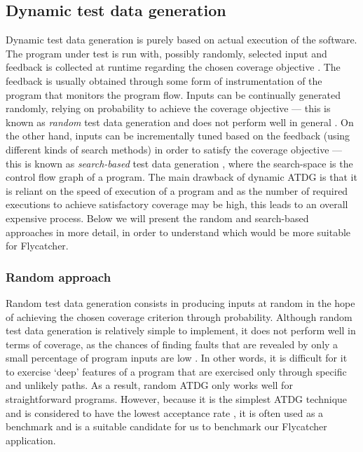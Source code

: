 \subsection{Dynamic test data generation}

Dynamic test data generation is purely based on actual execution of the software. The program under test is run with, possibly randomly, selected input and feedback is collected at runtime regarding the chosen coverage objective \cite{edvardsson1999survey}. The feedback is usually obtained through some form of instrumentation of the program that monitors the program flow. Inputs can be continually generated randomly, relying on probability to achieve the coverage objective --- this is known as \emph{random} test data generation and does not perform well in general \cite{edvardsson1999survey}. On the other hand, inputs can be incrementally tuned based on the feedback (using different kinds of search methods) in order to satisfy the coverage objective --- this is known as \emph{search-based} test data generation \cite{mcminn2004search}, where the search-space is the control flow graph of a program. The main drawback of dynamic ATDG is that it is reliant on the speed of execution of a program and as the number of required executions to achieve satisfactory coverage may be high, this leads to an overall expensive process. Below we will present the random and search-based approaches in more detail, in order to understand which would be more suitable for \textsf{Flycatcher}.

\subsubsection{Random approach}

Random test data generation consists in producing inputs at random in the hope of achieving the chosen coverage criterion through probability. Although random test data generation is relatively simple to implement, it does not perform well in terms of coverage, as the chances of finding faults that are revealed by only a small percentage of program inputs are low \cite{edvardsson1999survey}. In other words, it is difficult for it to exercise `deep' features of a program that are exercised only through specific and unlikely paths. As a result, random ATDG only works well for straightforward programs. However, because it is the simplest ATDG technique and is considered to have the lowest acceptance rate \cite{edvardsson1999survey}, it is often used as a benchmark and is a suitable candidate for us to benchmark our \textsf{Flycatcher} application.

